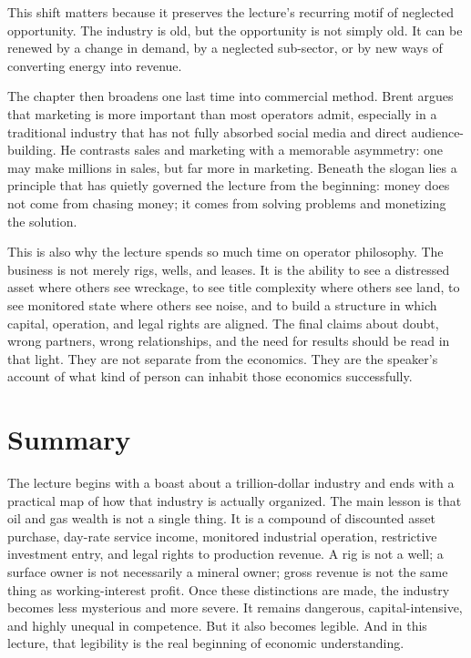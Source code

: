This shift matters because it preserves the lecture's recurring motif of neglected opportunity. The industry is old, but the opportunity is not simply old. It can be renewed by a change in demand, by a neglected sub-sector, or by new ways of converting energy into revenue.

The chapter then broadens one last time into commercial method. Brent argues that marketing is more important than most operators admit, especially in a traditional industry that has not fully absorbed social media and direct audience-building. He contrasts sales and marketing with a memorable asymmetry: one may make millions in sales, but far more in marketing. Beneath the slogan lies a principle that has quietly governed the lecture from the beginning: money does not come from chasing money; it comes from solving problems and monetizing the solution.

This is also why the lecture spends so much time on operator philosophy. The business is not merely rigs, wells, and leases. It is the ability to see a distressed asset where others see wreckage, to see title complexity where others see land, to see monitored state where others see noise, and to build a structure in which capital, operation, and legal rights are aligned. The final claims about doubt, wrong partners, wrong relationships, and the need for results should be read in that light. They are not separate from the economics. They are the speaker's account of what kind of person can inhabit those economics successfully.

\section{Summary}

The lecture begins with a boast about a trillion-dollar industry and ends with a practical map of how that industry is actually organized. The main lesson is that oil and gas wealth is not a single thing. It is a compound of discounted asset purchase, day-rate service income, monitored industrial operation, restrictive investment entry, and legal rights to production revenue. A rig is not a well; a surface owner is not necessarily a mineral owner; gross revenue is not the same thing as working-interest profit. Once these distinctions are made, the industry becomes less mysterious and more severe. It remains dangerous, capital-intensive, and highly unequal in competence. But it also becomes legible. And in this lecture, that legibility is the real beginning of economic understanding.